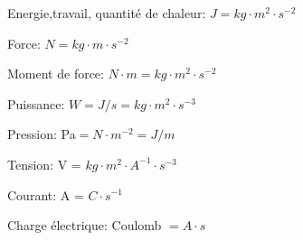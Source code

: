 	
\squishlist
	\item Energie,travail, quantité de chaleur:	$J= kg\cdot m^2\cdot s^{-2}$
	\item Force:		$N= kg\cdot m \cdot s^{-2}$
	\item Moment de force:	$N\cdot m= kg\cdot m^2 \cdot s^{-2}$
	\item Puissance:	$W=J/s=kg\cdot m^2 \cdot s^{-3}$
	\item Pression:	Pa$=N\cdot m^{-2}=J/m$
	\item Tension:	V = $kg\cdot m^2\cdot A^{-1} \cdot s^{-3}$
	\item Courant:  	A = $ C\cdot s^{-1}$ 
	\item Charge électrique:	 Coulomb $= A\cdot s$
\squishend

